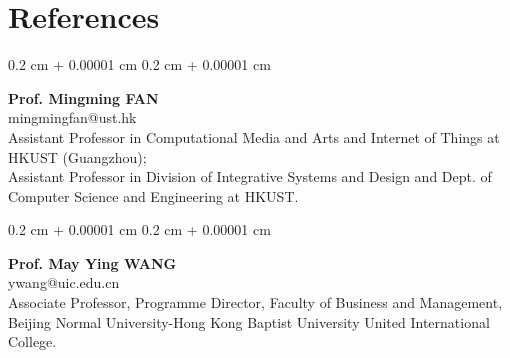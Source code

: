 \documentclass[10pt, letterpaper]{article}
\newenvironment{onecolentry}{
    \begin{adjustwidth}{
        0.2 cm + 0.00001 cm
    }{
        0.2 cm + 0.00001 cm
    }
}{
    \end{adjustwidth}
} %
\begin{document}
    \section{References}

        \begin{onecolentry}
            \textbf{Prof. Mingming FAN} \\
            mingmingfan@ust.hk \\
            Assistant Professor in Computational Media and Arts and Internet of Things at HKUST (Guangzhou); \\
            Assistant Professor in Division of Integrative Systems and Design and Dept. of Computer Science and Engineering at HKUST.
        \end{onecolentry}

        \vspace{0.2 cm}

        \begin{onecolentry}
            \textbf{Prof. May Ying WANG} \\
            ywang@uic.edu.cn \\
            Associate Professor, Programme Director, Faculty of Business and Management, Beijing Normal University-Hong Kong Baptist University United International College.
        \end{onecolentry}
\end{document}
